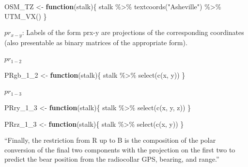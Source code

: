 \documentclass[
]{article}
\newenvironment{Shaded}{\begin{snugshade}}{\end{snugshade}}
\newcommand{\ControlFlowTok}[1]{\textcolor[rgb]{0.13,0.29,0.53}{\textbf{#1}}}
\newcommand{\FunctionTok}[1]{\textcolor[rgb]{0.00,0.00,0.00}{#1}}
\newcommand{\NormalTok}[1]{#1}
\newcommand{\OtherTok}[1]{\textcolor[rgb]{0.56,0.35,0.01}{#1}}
\newcommand{\SpecialCharTok}[1]{\textcolor[rgb]{0.00,0.00,0.00}{#1}}
\newcommand{\StringTok}[1]{\textcolor[rgb]{0.31,0.60,0.02}{#1}}
\begin{document}
\begin{Shaded}
\begin{Highlighting}[]
\NormalTok{OSM\_TZ }\OtherTok{\textless{}{-}} \ControlFlowTok{function}\NormalTok{(stalk)\{}
\NormalTok{    stalk }\SpecialCharTok{\%\textgreater{}\%} 
    \FunctionTok{textcoords}\NormalTok{(}\StringTok{"Asheville"}\NormalTok{) }\SpecialCharTok{\%\textgreater{}\%}
    \FunctionTok{UTM\_VX}\NormalTok{()}
\NormalTok{\}}
\end{Highlighting}
\end{Shaded}

\(pr_{x-y}\): Labels of the form prx-y are projections of the
corresponding coordinates (also presentable as binary matrices of the
appropriate form).

\(pr_{1-2}\)

\begin{Shaded}
\begin{Highlighting}[]
\NormalTok{PRgb\_1\_2 }\OtherTok{\textless{}{-}} \ControlFlowTok{function}\NormalTok{(stalk)\{}
\NormalTok{  stalk }\SpecialCharTok{\%\textgreater{}\%}
    \FunctionTok{select}\NormalTok{(}\FunctionTok{c}\NormalTok{(x, y)) }
\NormalTok{\}}
\end{Highlighting}
\end{Shaded}

\(pr_{1-3}\)

\begin{Shaded}
\begin{Highlighting}[]
\NormalTok{PRry\_1\_3 }\OtherTok{\textless{}{-}} \ControlFlowTok{function}\NormalTok{(stalk)\{}
\NormalTok{  stalk }\SpecialCharTok{\%\textgreater{}\%}
    \FunctionTok{select}\NormalTok{(}\FunctionTok{c}\NormalTok{(x, y, z))}
\NormalTok{\}}
\end{Highlighting}
\end{Shaded}

\begin{Shaded}
\begin{Highlighting}[]
\NormalTok{PRrz\_1\_3 }\OtherTok{\textless{}{-}} \ControlFlowTok{function}\NormalTok{(stalk)\{}
\NormalTok{  stalk }\SpecialCharTok{\%\textgreater{}\%}
    \FunctionTok{select}\NormalTok{(}\FunctionTok{c}\NormalTok{(x, y)) }
\NormalTok{\}}
\end{Highlighting}
\end{Shaded}

``Finally, the restriction from R up to B is the composition of the
polar conversion of the final two components with the projection on the
first two to predict the bear position from the radiocollar GPS,
bearing, and range.''
\end{document}
